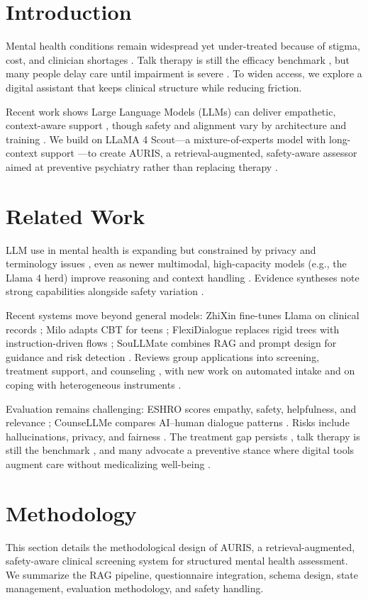 \documentclass{svproc}
\begin{document}
\section{Introduction}
Mental health conditions remain widespread yet under-treated because of stigma, cost, and clinician shortages \cite{1,2}. Talk therapy is still the efficacy benchmark \cite{3,21}, but many people delay care until impairment is severe \cite{2}. To widen access, we explore a digital assistant that keeps clinical structure while reducing friction.

Recent work shows Large Language Models (LLMs) can deliver empathetic, context-aware support \cite{4,5,6,7}, though safety and alignment vary by architecture and training \cite{8}. We build on LLaMA 4 Scout---a mixture-of-experts model with long-context support \cite{9,10,11}---to create AURIS, a retrieval-augmented, safety-aware assessor aimed at preventive psychiatry rather than replacing therapy \cite{1,22}.

\section{Related Work}
LLM use in mental health is expanding but constrained by privacy and terminology issues \cite{12}, even as newer multimodal, high-capacity models (e.g., the Llama 4 herd) improve reasoning and context handling \cite{11}. Evidence syntheses note strong capabilities alongside safety variation \cite{4,5,6,7,8,20}.

Recent systems move beyond general models: ZhiXin fine-tunes Llama on clinical records \cite{12}; Milo adapts CBT for teens \cite{13}; FlexiDialogue replaces rigid trees with instruction-driven flows \cite{14}; SouLLMate combines RAG and prompt design for guidance and risk detection \cite{15}. Reviews group applications into screening, treatment support, and counseling \cite{5}, with new work on automated intake \cite{16} and on coping with heterogeneous instruments \cite{17}.

Evaluation remains challenging: ESHRO scores empathy, safety, helpfulness, and relevance \cite{18}; CounseLLMe compares AI--human dialogue patterns \cite{19}. Risks include hallucinations, privacy, and fairness \cite{8,20}. The treatment gap persists \cite{2}, talk therapy is still the benchmark \cite{3,21}, and many advocate a preventive stance where digital tools augment care without medicalizing well-being \cite{1,22}.

\section{Methodology}
This section details the methodological design of AURIS, a retrieval-augmented, safety-aware clinical screening system for structured mental health assessment. We summarize the RAG pipeline, questionnaire integration, schema design, state management, evaluation methodology, and safety handling.
\end{document}
